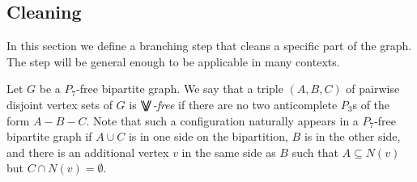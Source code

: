 \documentclass[11pt,a4paper]{article}
\newtheorem{lemma}[theorem]{Lemma}
\theoremstyle{definition}
\def\T{\mathcal{T}}
\newcommand{\VV}{$\bigvee\mkern-15mu\bigvee$}
\begin{document}
%


\subsection{Cleaning}\label{ss:bip-cleaning}

In this section we define a branching step that cleans a specific part of the graph.
The step will be general enough to be applicable in many contexts.

Let $G$ be a $P_7$-free bipartite graph. 
We say that a triple $(A,B,C)$ of pairwise disjoint vertex sets of $G$ is \emph{\VV-free} if there are no two anticomplete $P_3$s of the form $A-B-C$. Note that such a configuration naturally appears in a $P_7$-free bipartite graph if $A \cup C$ is in one side on the bipartition, $B$ is in the other side, and there is an additional vertex $v$ in the same side as $B$ such that $A \subseteq N(v)$ but $C \cap N(v) = \emptyset$.
\end{document}
